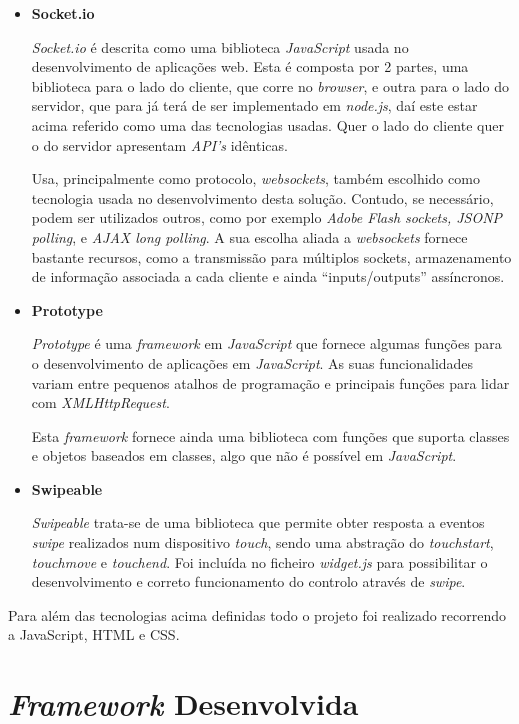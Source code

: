 \begin{itemize}
\item \textbf{Socket.io}

\textit{Socket.io} é descrita como uma biblioteca \textit{JavaScript} usada no desenvolvimento de aplicações web. Esta é composta por 2 partes, uma biblioteca para o lado do cliente, que corre no \textit{browser}, e outra para o lado do servidor, que para já terá de ser implementado em \textit{node.js}, daí este estar acima referido como uma das tecnologias usadas. Quer o lado do cliente quer o do servidor apresentam \textit{API’s} idênticas. 

Usa, principalmente como protocolo, \textit{websockets}, também escolhido como tecnologia usada no desenvolvimento desta solução. Contudo, se necessário, podem ser utilizados outros, como por exemplo \textit{Adobe Flash sockets, JSONP polling}, e \textit{AJAX long polling}. 
A sua escolha aliada a \textit{websockets} fornece bastante recursos, como a transmissão para múltiplos sockets, armazenamento de informação associada a cada cliente e ainda ``inputs/outputs'' assíncronos. 

\item \textbf{Prototype}

\textit{Prototype} é uma \textit{framework} em \textit{JavaScript} que fornece algumas funções para o desenvolvimento de aplicações em \textit{JavaScript}. As suas funcionalidades variam entre pequenos atalhos de programação e principais funções para lidar com \textit{XMLHttpRequest}.

Esta \textit{framework} fornece ainda uma biblioteca com funções que suporta classes e objetos baseados em classes, algo que não é possível em \textit{JavaScript}.

\item \textbf{Swipeable}

\textit{Swipeable} trata-se de uma biblioteca que permite obter resposta a eventos \textit{swipe} realizados num dispositivo \textit{touch}, sendo uma abstração do \textit{touchstart}, \textit{touchmove} e \textit{touchend}. 
Foi incluída no ficheiro \textit{widget.js} para possibilitar o desenvolvimento e correto funcionamento do controlo através de \textit{swipe}.

\end{itemize}

Para além das tecnologias acima definidas todo o projeto foi realizado recorrendo a JavaScript, HTML e CSS. 


\section{\textit{Framework} Desenvolvida} \label{sec:framework}

